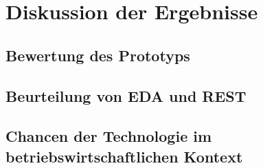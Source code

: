 \section{Diskussion der Ergebnisse}
\subsection{Bewertung des Prototyps} 
\subsection{Beurteilung von EDA und REST}
\subsection{Chancen der Technologie im betriebswirtschaftlichen Kontext}
